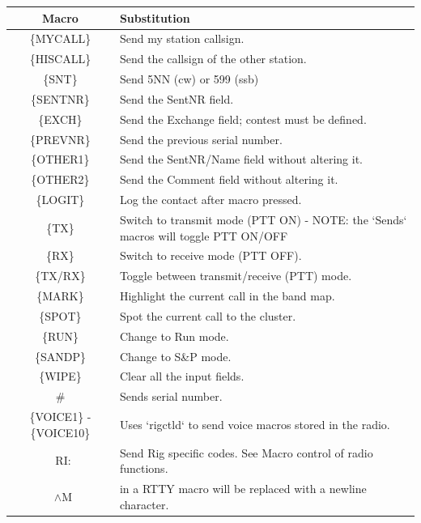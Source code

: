 \documentclass{article}
\begin{document}
\vspace{0.5cm}
\begin{tabular}{| c | p{9cm} |}
    \hline
    \textbf{Macro} & \textbf{Substitution} \\
    \hline
    \{MYCALL\} & Send my station callsign. \\
    \hline
    \{HISCALL\} & Send the callsign of the other station. \\
    \hline
    \{SNT\} & Send 5NN (cw) or 599 (ssb) \\
    \hline
    \{SENTNR\} & Send the SentNR field. \\
    \hline
    \{EXCH\} & Send the Exchange field; contest must be defined. \\
    \hline
    \{PREVNR\} & Send the previous serial number. \\
    \hline
    \{OTHER1\} & Send the SentNR/Name field without altering it. \\
    \hline
    \{OTHER2\} & Send the Comment field without altering it. \\
    \hline
    \{LOGIT\} & Log the contact after macro pressed. \\
    \hline
    \{TX\} & Switch to transmit mode (PTT ON) - NOTE: the `Sends` macros will toggle PTT ON/OFF \\
    \hline
    \{RX\} & Switch to receive mode (PTT OFF). \\
    \hline
    \{TX/RX\} & Toggle between transmit/receive (PTT) mode. \\
    \hline
    \{MARK\} & Highlight the current call in the band map. \\
    \hline
    \{SPOT\} & Spot the current call to the cluster. \\
    \hline
    \{RUN\} & Change to Run mode. \\
    \hline
    \{SANDP\} & Change to S\&P mode. \\
    \hline
    \{WIPE\} & Clear all the input fields. \\
    \hline
    \# & Sends serial number. \\
    \hline
    \{VOICE1\} - \{VOICE10\} & Uses `rigctld`\index{rigctld} to send voice macros stored in the radio. \\
    \hline
    \ RI: & Send Rig specific codes. See Macro control of radio functions. \\
    \hline
    \ $\wedge$M & 	in a RTTY macro will be replaced with a newline character. \\
    \hline
\end{tabular}
\end{document}
